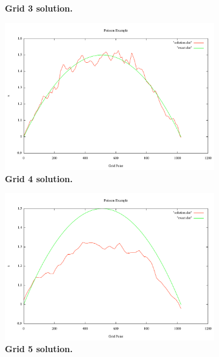 \documentclass[note]{TechNote}
\begin{document}
\begin{figure}[h!]
\begin{subfigure}[b]{0.32\textwidth}
    \caption{\textbf{Grid 3 solution.}}
  \end{subfigure}
  \begin{subfigure}[b]{0.32\textwidth}
    \includegraphics[width=\textwidth]{cg_4_level.pdf}
    \caption{\textbf{Grid 4 solution.}}
  \end{subfigure}
  \begin{subfigure}[b]{0.32\textwidth}
    \includegraphics[width=\textwidth]{cg_5_level.pdf}
    \caption{\textbf{Grid 5 solution.}}
  \end{subfigure}
  \begin{subfigure}[b]{0.32\textwidth}

\end{subfigure}
\end{figure}
\end{document}
